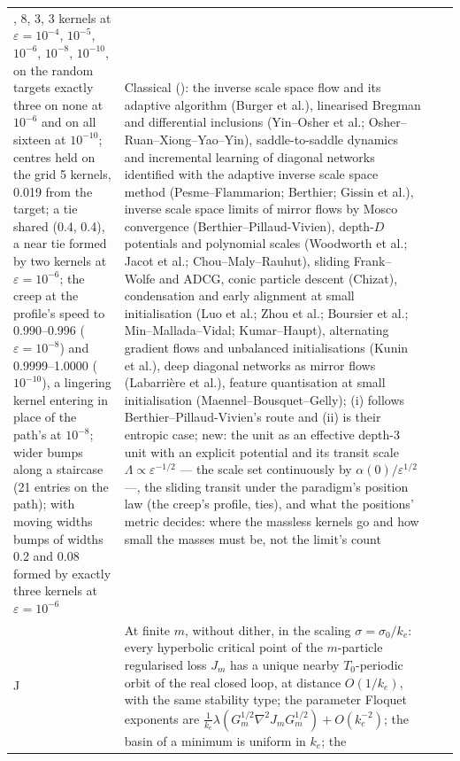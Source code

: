 {\begin{longtable}{@{}>{\raggedright\arraybackslash}p{}>{\raggedright\arraybackslash}p{}%
>{\raggedright\arraybackslash}p{}>{\raggedright\arraybackslash}p{}@{}}
12, 8, 3, 3 kernels at $\varepsilon = 10^{-4}$, $10^{-5}$, $10^{-6}$, $10^{-8}$, $10^{-10}$, on the random targets
exactly three on none at $10^{-6}$ and on all sixteen at $10^{-10}$; centres held on the grid 5 kernels, 0.019 from the
target; a tie shared (0.4, 0.4), a near tie formed by two kernels at $\varepsilon = 10^{-6}$; the creep at the profile's
speed to 0.990--0.996 ($\varepsilon = 10^{-8}$) and 0.9999--1.0000 ($10^{-10}$), a lingering kernel entering in place of
the path's at $10^{-8}$; wider bumps along a staircase (21 entries on the path); with moving widths bumps of widths 0.2
and 0.08 formed by exactly three kernels at $\varepsilon = 10^{-6}$
& Classical (\cite{S75}): the inverse scale space flow and its adaptive algorithm (Burger et al.), linearised Bregman and
differential inclusions (Yin--Osher et al.; Osher--Ruan--Xiong--Yao--Yin), saddle-to-saddle dynamics and incremental
learning of diagonal networks identified with the adaptive inverse scale space method (Pesme--Flammarion; Berthier;
Gissin et al.), inverse scale space limits of mirror flows by Mosco convergence (Berthier--Pillaud-Vivien), depth-$D$
potentials and polynomial scales (Woodworth et al.; Jacot et al.; Chou--Maly--Rauhut), sliding Frank--Wolfe and ADCG,
conic particle descent (Chizat), condensation and early alignment at small initialisation (Luo et al.; Zhou et al.;
Boursier et al.; Min--Mallada--Vidal; Kumar--Haupt), alternating gradient flows and unbalanced initialisations (Kunin et
al.), deep diagonal networks as mirror flows (Labarri\`ere et al.), feature quantisation at small initialisation
(Maennel--Bousquet--Gelly); (i) follows Berthier--Pillaud-Vivien's route and (ii) is their entropic case; new: the unit
as an effective depth-3 unit with an explicit potential and its transit scale $\Lambda\propto\varepsilon^{-1/2}$ --- the
scale set continuously by $\alpha(0)/\varepsilon^{1/2}$ ---, the sliding transit under the paradigm's position law (the
creep's profile, ties), and what the positions' metric decides: where the massless kernels go and how small the masses
must be, not the limit's count\\
\addlinespace[0.5pt]
J & At finite $m$, without dither, in the scaling $\sigma = \sigma_0/k_e$: every hyperbolic critical point of the
$m$-particle regularised loss $J_m$ has a unique nearby $T_0$-periodic orbit of the real closed loop, at distance
$O(1/k_e)$, with the same stability type; the parameter Floquet exponents are
$\frac1{k_e}\lambda(G_m^{1/2}\nabla^2J_mG_m^{1/2}) + O(k_e^{-2})$; the basin of a minimum is uniform in $k_e$; the

\end{longtable}}
